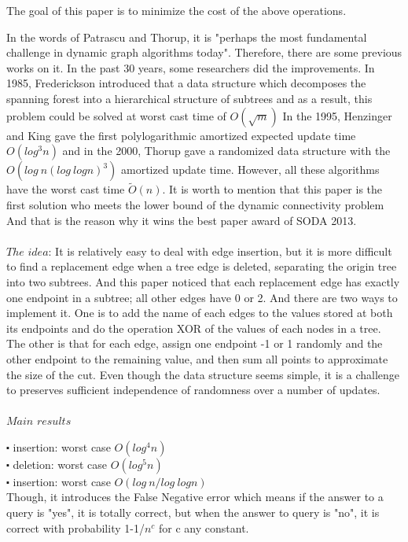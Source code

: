 \documentclass[conference,compsoc]{IEEEtran}
\begin{document}
The goal of this paper is to minimize the cost of  the above operations. 

In the words of Patrascu and Thorup, it is "perhaps the most fundamental challenge in dynamic graph algorithms today".  Therefore, there are some previous works on it. In the past 30 years, some researchers did the improvements. In 1985, Frederickson introduced that a data structure which decomposes the spanning forest into a hierarchical structure of subtrees and as a result, this problem could be solved at worst cast time of $O(\sqrt m)$ 
In the 1995, Henzinger and King gave the first polylogarithmic amortized expected update time $O(log^3 n)$ and in the 2000, Thorup gave a randomized data structure with the $O(log\ n(log \ log n)^3)$ amortized update time. However, all these algorithms have the worst cast time $\tilde{O} (n)$.
It is worth to mention that this paper is the first solution who meets the lower bound of the dynamic connectivity problem And that is the reason why it wins the best paper award of SODA 2013.
\\
\\
$The$ $idea$: 
It is relatively easy to deal with edge insertion, but it is more difficult to find a replacement edge when a tree edge is deleted, separating the origin tree into two subtrees. And this paper noticed that each replacement edge has exactly one endpoint in a subtree; all other edges have 0 or 2. And there are two ways to implement it. One is to add the name of each edges to the values stored at both its endpoints and do the operation XOR of the values of each nodes in a tree. The other is that for each edge, assign one endpoint -1 or 1 randomly and the other endpoint to the remaining value, and then sum all points to approximate the size of the cut. Even though the data structure seems simple, it is a challenge to preserves sufficient independence of randomness over a number of updates.
\\
\\
$Main$ $results$


$\centerdot$  insertion: worst case $O(log^4n)$\\

$\centerdot$  deletion: worst case $O(log^5n)$\\

$\centerdot$  insertion: worst case $O(log\ n/log\ log n)$\\

Though, it introduces the False Negative error which means if the answer to a query is "yes", it is totally correct, but when the answer to query is "no", it is correct with probability 1-1/$n^c$ for c any constant.
\\
\end{document}
